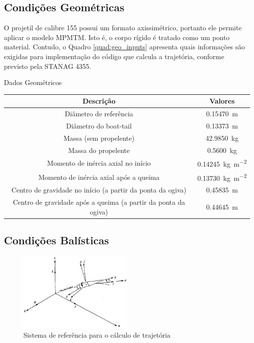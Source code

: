 \subsection{Condições Geométricas}\label{subsec:condicoes-geometricas}

O projetil de calibre \qty{155}{\millimetre} possui um formato axissimétrico, portanto ele permite aplicar o modelo MPMTM. Isto é, o corpo rígido é tratado como um ponto material. Contudo, o Quadro \ref{quad:geo_inputs} apresenta quais informações são exigidas para implementação do código que calcula a trajetória, conforme previsto pela STANAG 4355.

\begin{quadro}[htb]
\caption{\label{quad:geo_inputs}Dados Geométricos}
\begin{tabular}{|c|c|}
    \hline
    \textbf{Descrição} & \textbf{Valores} \\ 
    \hline
    Diâmetro de referência & \qty{0,15470}{\metre} \\ 
    \hline
    Diâmetro do boat-tail & \qty{0,13373}{\metre} \\ 
    \hline
    Massa (sem propelente) & \qty{42,9850}{\kilogram} \\ 
    \hline
    Massa do propelente & \qty{0,5600}{\kilogram} \\ 
    \hline
    Momento de inércia axial no início & \qty{0,14245}{\kilogram\per\square\metre} \\ 
    \hline
    Momento de inércia axial após a queima & \qty{0,13730}{\kilogram\per\square\metre} \\
    \hline
    Centro de gravidade no início (a partir da ponta da ogiva) & \qty{0,45835}{\metre} \\
    \hline
    Centro de gravidade após a queima (a partir da ponta da ogiva) & \qty{0,44645}{\metre} \\
    \hline
\end{tabular}
\end{quadro}

\subsection{Condições Balísticas}\label{subsec:condicoes-balisticas}

\begin{figure}[!ht]
	\centering
	\includegraphics[width=0.5\textwidth]{foto02-mccoy2012.png}   
	\caption[Sistema de referência para o cálculo de trajetória]{Sistema de referência para o cálculo de trajetória \cite{McCoy2012}}
	\label{fig:traj-ref-mccoy2012}
\end{figure}

